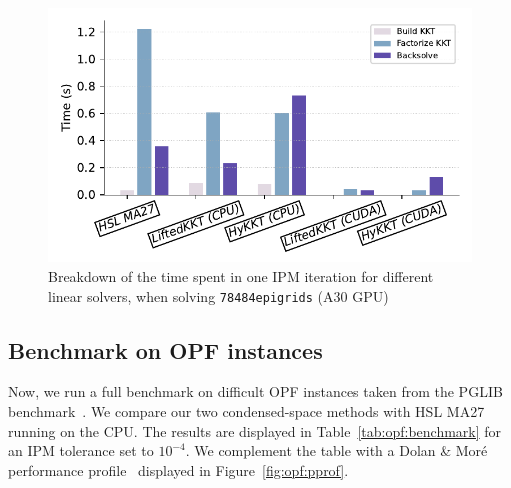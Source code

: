 \begin{figure}[!ht]
  \centering
  \includegraphics[width=.7\textwidth]{../figures/breakdown.pdf}
  \caption{Breakdown of the time spent in one IPM iteration
    for different linear solvers, when solving {\tt 78484epigrids} (A30 GPU)
  \label{fig:timebreakdown}}
\end{figure}



\subsection{Benchmark on OPF instances}
Now, we run a full benchmark on difficult OPF instances taken
from the PGLIB benchmark~\cite{babaeinejadsarookolaee2019power}.
We compare our two condensed-space methods with HSL MA27 running
on the CPU. The results are displayed in Table~\ref{tab:opf:benchmark}
for an IPM tolerance set to $10^{-4}$.
We complement the table with a Dolan \& Moré performance profile~\cite{dolan2002benchmarking} displayed
in Figure~\ref{fig:opf:pprof}.

